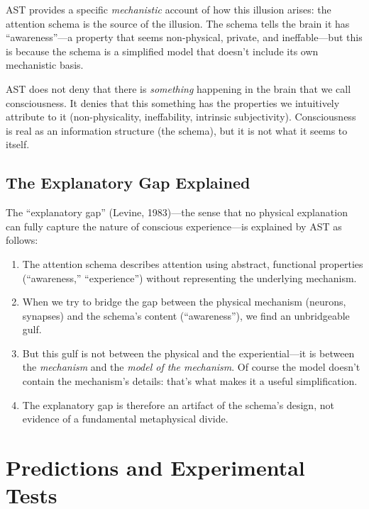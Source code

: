 \documentclass[11pt,a4paper]{report}
\begin{document}
AST provides a specific \emph{mechanistic} account of how this illusion arises: the attention schema is the source of the illusion. The schema tells the brain it has ``awareness''---a property that seems non-physical, private, and ineffable---but this is because the schema is a simplified model that doesn't include its own mechanistic basis.

\begin{notebox}
AST does not deny that there is \emph{something} happening in the brain that we call consciousness. It denies that this something has the properties we intuitively attribute to it (non-physicality, ineffability, intrinsic subjectivity). Consciousness is real as an information structure (the schema), but it is not what it seems to itself.
\end{notebox}

\section{The Explanatory Gap Explained}

The ``explanatory gap'' (Levine, 1983)---the sense that no physical explanation can fully capture the nature of conscious experience---is explained by AST as follows:

\begin{enumerate}[leftmargin=2em]
  \item The attention schema describes attention using abstract, functional properties (``awareness,'' ``experience'') without representing the underlying mechanism.
  \item When we try to bridge the gap between the physical mechanism (neurons, synapses) and the schema's content (``awareness''), we find an unbridgeable gulf.
  \item But this gulf is not between the physical and the experiential---it is between the \emph{mechanism} and the \emph{model of the mechanism}. Of course the model doesn't contain the mechanism's details: that's what makes it a useful simplification.
  \item The explanatory gap is therefore an artifact of the schema's design, not evidence of a fundamental metaphysical divide.
\end{enumerate}


\chapter{Predictions and Experimental Tests}
\end{document}
